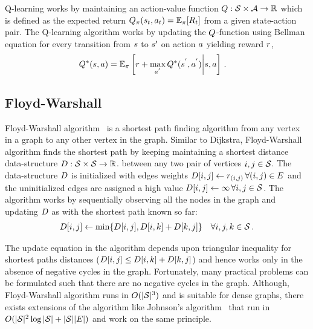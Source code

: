 Q-learning works by maintaining an action-value function $Q : \mathcal{S} \times
\mathcal{A} \rightarrow \mathbb{R}$ which is defined as the expected return
$Q_\pi(s_t, a_t) = \mathbb{E}_\pi[R_t]$ from a given state-action pair.
The Q-learning algorithm works by updating the $Q$-function using Bellman
equation for every transition from $s$ to $s'$ on action $a$
yielding reward $r$, 
%
\begin{align}
  Q^*(s, a) &= \mathbb{E}_{\pi}\left[
                       r + \max_{a^{'}} Q^*(s^{'}, a^{'})
                       \middle| s, a \right] \, .
    \label{eq:q-learn-bellman}
\end{align}%
%

\subsection{Floyd-Warshall}

Floyd-Warshall algorithm~\citep{floydwarshall1962} is a shortest path finding
algorithm from any vertex in a graph to any other vertex in the graph.
Similar to Dijkstra, Floyd-Warshall algorithm
finds the shortest path by keeping maintaining a shortest distance
data-structure $D : \mathcal{S} \times \mathcal{S} \rightarrow \mathbb{R}$. between any
two pair of vertices $i, j \in \mathcal{S}$.
The data-structure $D$ is initialized with edges weights
$D[i, j] \leftarrow r_{(i, j)} \, \forall (i, j) \in E$
and the uninitialized edges are assigned a high value
$D[i, j] \leftarrow \infty \, \forall i, j \in \mathcal{S}$.
The algorithm works by sequentially observing all the nodes in the graph and
updating $D$ as with the shortest path known so far:
%
\begin{align}
  D[i, j] \leftarrow \min\{ D[i, j], D[i, k] + D[k, j] \} \quad
  \forall i, j, k \in \mathcal{S} \, .
\end{align}%
%


The update equation in the algorithm depends upon triangular inequality for
shortest paths distances ($D[i, j] \le D[i, k] + D[k, j]$) and hence
works only in the absence of negative cycles in the graph. Fortunately, many
practical problems can be formulated such that there are no negative cycles
in the graph. Although, Floyd-Warshall algorithm runs in $O(|\mathcal{S}|^3)$
and is suitable for dense graphs, there exists extensions of the algorithm
like Johnson's algorithm~\citep{johnson1977efficient} that run in
$O(|\mathcal{S}|^2\log|\mathcal{S}| + |\mathcal{S}||E|)$ and work on the same
principle.

